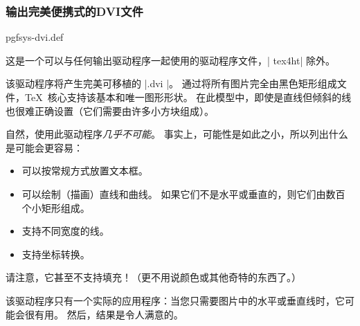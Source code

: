 \subsubsection{输出完美便携式的DVI文件}

\begin{filedescription}{pgfsys-dvi.def}

    这是一个可以与任何输出驱动程序一起使用的驱动程序文件，| tex4ht| 除外。


    该驱动程序将产生完美可移植的 |.dvi |。 通过将所有图片完全由黑色矩形组成文件，\TeX\ 核心支持该基本和唯一图形形状。 在此模型中，即使是直线但倾斜的线也很难正确设置（它们需要由许多小方块组成）。


    自然，使用此驱动程序\emph{几乎不可能}。 事实上，可能性是如此之小，所以列出什么是可能会更容易：
    \begin{itemize}
        \item 可以按常规方式放置文本框。
        \item 可以绘制（描画）直线和曲线。 如果它们不是水平或垂直的，则它们由数百个小矩形组成。
        \item 支持不同宽度的线。
        \item 支持坐标转换。
    \end{itemize}
    请注意，它甚至不支持填充！（更不用说颜色或其他奇特的东西了。）


    该驱动程序只有一个实际的应用程序：当您只需要图片中的水平或垂直线时，它可能会很有用。 然后，结果是令人满意的。
\end{filedescription}
